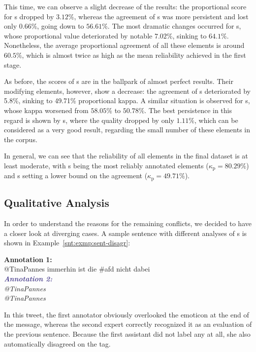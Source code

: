 This time, we can observe a slight decrease of the results: the
proportional score for s dropped by $3.12\%$,
whereas the agreement of s was more persistent and
lost only $0.66\%$, going down to $56.61\%$.  The most dramatic
changes occurred for s, whose proportional value
deteriorated by notable $7.02\%$, sinking to $64.1\%$.  Nonetheless,
the average proportional agreement of all these elements is around
$60.5\%$, which is almost twice as high as the mean reliability
achieved in the first stage.

As before, the scores of s are in the ballpark of
almost perfect results.  Their modifying elements, however, show a
decrease: the agreement of s deteriorated by
5.8\%, sinking to 49.71\% proportional kappa.  A similar situation is
observed for s, whose kappa worsened from
$58.05\%$ to $50.78\%$.  The best persistence in this regard is shown
by s, where the quality dropped by only $1.11\%$,
which can be considered as a very good result, regarding the small
number of these elements in the corpus.

In general, we can see that the reliability of all elements in the
final dataset is at least moderate, with s being
the most reliably annotated elements ($\kappa_{\textrm{p}}=80.29\%$)
and s setting a lower bound on the agreement
($\kappa_{\textrm{p}}=49.71\%$).

\subsection{Qualitative Analysis}\label{subsec:eval-qualitative-analysis}

In order to understand the reasons for the remaining conflicts, we
decided to have a closer look at diverging cases.  A sample sentence
with different analyses of s is shown in
Example~\ref{snt:exmp:sent-disagr}:
\begin{example}\label{snt:exmp:sent-disagr}
  \textcolor{red3}{\textbf{Annotation 1:}}\\ \upshape{}@TinaPannes
  immerhin ist die \#afd nicht dabei \smiley{}\\[0.8em]\itshape
  \noindent\textcolor{darkslateblue}{\textbf{\itshape Annotation
      2:}}\\ \upshape{}@TinaPannes
  \\[0.8em]
  \noindent\itshape{}@TinaPannes
  \upshape{}
\end{example}
In this tweet, the first annotator obviously overlooked the emoticon
\smiley{} at the end of the message, whereas the second expert
correctly recognized it as an evaluation of the previous sentence.
Because the first assistant did not label any  at
all, she also automatically disagreed on the  tag.

